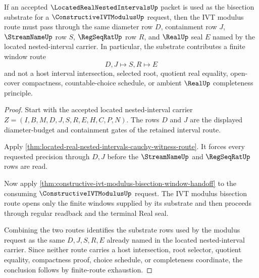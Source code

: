 \begin{theorem}
\label{thm:located-real-nested-intervals-constructive-ivt-window-route}
If an accepted $\LocatedRealNestedIntervalsUp$ packet is used as the bisection substrate for a $\ConstructiveIVTModulusUp$ request, then the IVT modulus route must pass through the same diameter row $D$, containment row $J$, $\StreamNameUp$ row $S$, $\RegSeqRatUp$ row $R$, and $\RealUp$ seal $E$ named by the located nested-interval carrier. In particular, the substrate contributes a finite window route
$$
D,J \longmapsto S,R \longmapsto E
$$
and not a host interval intersection, selected root, quotient real equality, open-cover compactness, countable-choice schedule, or ambient $\RealUp$ completeness principle.
\end{theorem}
\begin{proof}
Start with the accepted located nested-interval carrier $Z=(I,B,M,D,J,S,R,E,H,C,P,N)$. The rows $D$ and $J$ are the displayed diameter-budget and containment gates of the retained interval route.

Apply \autoref{thm:located-real-nested-intervals-cauchy-witness-route}. It forces every requested precision through $D,J$ before the $\StreamNameUp$ and $\RegSeqRatUp$ rows are read.

Now apply \autoref{thm:constructive-ivt-modulus-bisection-window-handoff} to the consuming $\ConstructiveIVTModulusUp$ request. The IVT modulus bisection route opens only the finite windows supplied by its substrate and then proceeds through regular readback and the terminal Real seal.

Combining the two routes identifies the substrate rows used by the modulus request as the same $D,J,S,R,E$ already named in the located nested-interval carrier. Since neither route carries a host intersection, root selector, quotient equality, compactness proof, choice schedule, or completeness coordinate, the conclusion follows by finite-route exhaustion.
\end{proof}


